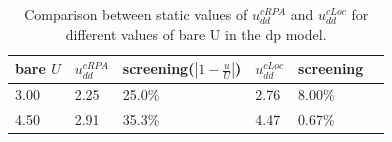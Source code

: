 \documentclass[10pt]{ruthesis}
\begin{document}
{\begin{table}[H]
\begin{center}
\begin{tabular}{|l|l|l|l|l|l|}
	\hline   
  bare $U$ & $u^{cRPA}_{dd}$&screening($|1-\frac{u}{U}|$)&$u^{cLoc}_{dd}$&screening\\
 \hline
  3.00&2.25&25.0\%&2.76&8.00\%\\
  4.50&2.91&35.3\%&4.47&0.67\%\\
  \hline
\end{tabular}
\end{center}
\caption{\label{table1}Comparison between static values of $u^{cRPA}_{dd}$ and $u^{cLoc}_{dd}$ for different values of bare U in the dp model.}
\end{table}

}
\end{document}
